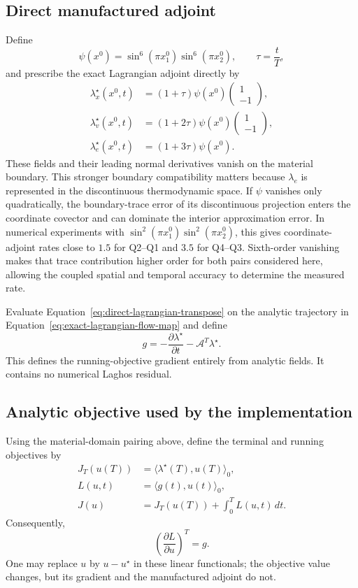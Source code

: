 \documentclass[11pt]{article}
\begin{document}
\subsection{Direct manufactured adjoint}

Define
\[
 \psi(x^0)=\sin^6(\pi x_1^0)\sin^6(\pi x_2^0),
 \qquad \tau=\frac{t}{T},
\]
and prescribe the exact Lagrangian adjoint directly by
\[
 \begin{aligned}
 \lambda_x^\star(x^0,t)
 &=(1+\tau)\psi(x^0)
 \begin{pmatrix}1\\-1\end{pmatrix},\\
 \lambda_v^\star(x^0,t)
 &=(1+2\tau)\psi(x^0)
 \begin{pmatrix}1\\-1\end{pmatrix},\\
 \lambda_e^\star(x^0,t)&=(1+3\tau)\psi(x^0).
 \end{aligned}
\]
These fields and their leading normal derivatives vanish on the material
boundary.  This stronger boundary compatibility matters because
$\lambda_e$ is represented in the discontinuous thermodynamic space.  If
$\psi$ vanishes only quadratically, the boundary-trace error of its
discontinuous projection enters the coordinate covector and can dominate
the interior approximation error.  In numerical experiments with
$\sin^2(\pi x_1^0)\sin^2(\pi x_2^0)$, this gives coordinate-adjoint rates close
to $1.5$ for Q2--Q1 and $3.5$ for Q4--Q3.  Sixth-order vanishing makes that
trace contribution higher order for both pairs considered here, allowing
the coupled spatial and temporal accuracy to determine the measured rate.

Evaluate Equation~\eqref{eq:direct-lagrangian-transpose} on the analytic
trajectory in Equation~\eqref{eq:exact-lagrangian-flow-map} and define
\begin{equation}
 \boxed{
 g=-\frac{\partial\lambda^\star}{\partial t}
 -\mathcal A^T\lambda^\star.}
 \label{eq:direct-lagrangian-running-gradient}
\end{equation}
This defines the running-objective gradient entirely from analytic fields.
It contains no numerical Laghos residual.

\subsection{Analytic objective used by the implementation}

Using the material-domain pairing above, define the terminal and running
objectives by
\begin{align}
 J_T(u(T))
 &=\langle\lambda^\star(T),u(T)\rangle_0,\\
 L(u,t)
 &=\langle g(t),u(t)\rangle_0,\\
 J(u)&=J_T(u(T))+\int_0^T L(u,t)\,dt.
\end{align}
Consequently,
\[
 \left(\frac{\partial L}{\partial u}\right)^T
 =g.
\]
One may replace $u$ by $u-u^\star$ in these linear functionals; the
objective value changes, but its gradient and the manufactured adjoint do
not.
\end{document}
